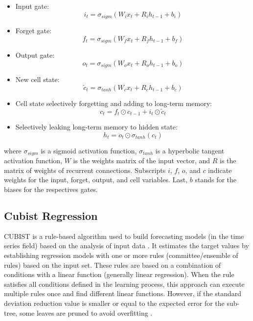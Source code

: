 \begin{itemize}
    \item Input gate: \begin{equation}i_t = \sigma_{sigm}(W_{i} x_t + R_{i} h_{t-1} + b_i)\end{equation}
    \item Forget gate: \begin{equation}f_t = \sigma_{sigm}(W_{f} x_t + R_{f} h_{t-1} + b_f)\end{equation}
    \item Output gate: \begin{equation}o_t = \sigma_{sigm}(W_{o} x_t + R_{o} h_{t-1} + b_o)\end{equation}
    \item New cell state: \begin{equation}\tilde{c}_t = \sigma_{tanh}(W_{c} x_t + R_{c} h_{t-1} + b_c)\end{equation}
    \item Cell state selectively forgetting and adding to long-term memory: \begin{equation}c_t = f_t \odot  c_{t-1} + i_t \odot \tilde{c}_t\end{equation}
    \item Selectively leaking long-term memory to hidden state: \begin{equation}h_t = o_t \odot \sigma_{tanh}(c_t)\end{equation}
\end{itemize}
where $\sigma_{sigm}$ is a sigmoid activation function, $\sigma_{tanh}$ is a hyperbolic tangent activation function, $W$ is the weights matrix of the input vector, and $R$ is the matrix of weights of recurrent connections. Subscripts $i$, $f$, $o$, and $c$ indicate weights for the input, forget, output, and cell variables. Last, $b$ stands for the biases for the respectives gates.

\subsection{Cubist Regression}
\ac{CUBIST} is a rule-based algorithm used to build forecasting models (in the time series field) based on the analysis of input data \cite{quinlan1992Learning}. It estimates the target values by establishing regression models with one or more rules (committee/ensemble of rules) based on the input set. These rules are based on a combination of conditions with a linear function (generally linear regression). When the rule satisfies all conditions defined in the learning process, this approach can execute multiple rules once and find different linear functions. However, if the standard deviation reduction value is smaller or equal to the expected error for the sub-tree, some leaves are pruned to avoid overfitting \cite{ribeiro2020Shortterm}. 

